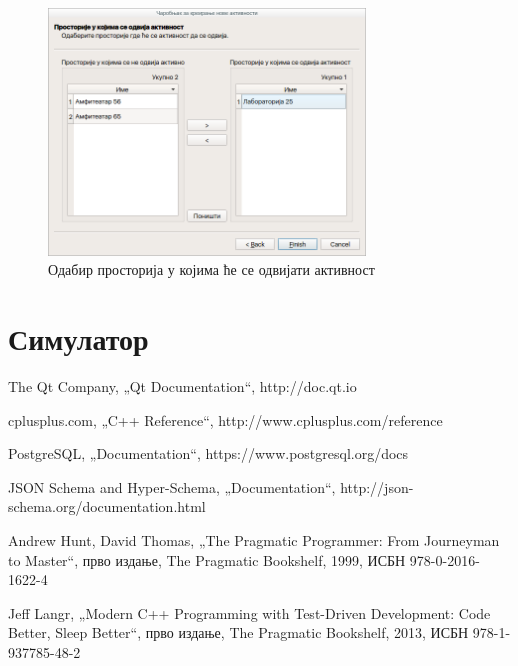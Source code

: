 \documentclass[a4paper, 12pt, diplomski]{etfcyr}
\def\quote#1{„#1“}
\begin{document}
\begin{justify}
\begin{figure}[H]
\begin{center}
							\includegraphics[width=0.75\textwidth]{manual/activity_wizard_rooms.png}
						\end{center}
						\caption{Одабир просторија у којима ће се одвијати активност}
						\label{figure:activity_rooms}
					\end{figure}
				\end{justify}

		\newpage

		\section{Симулатор}


	\begin{thebibliography}{9}
		The Qt Company, \quote{Qt Documentation},
		http://doc.qt.io

		cplusplus.com, \quote{C++ Reference},
		http://www.cplusplus.com/reference

		PostgreSQL, \quote{Documentation},
		https://www.postgresql.org/docs

		JSON Schema and Hyper-Schema, \quote{Documentation},
		http://json-schema.org/documentation.html

		Andrew Hunt, David Thomas, \quote{The Pragmatic Programmer: From Journeyman to Master},
		прво издање, The Pragmatic Bookshelf, 1999, ИСБН 978-0-2016-1622-4
		
		Jeff Langr, \quote{Modern C++ Programming with Test-Driven Development: Code Better, Sleep Better},
		прво издање, The Pragmatic Bookshelf, 2013, ИСБН 978-1-937785-48-2
	\end{thebibliography}
\end{document}
